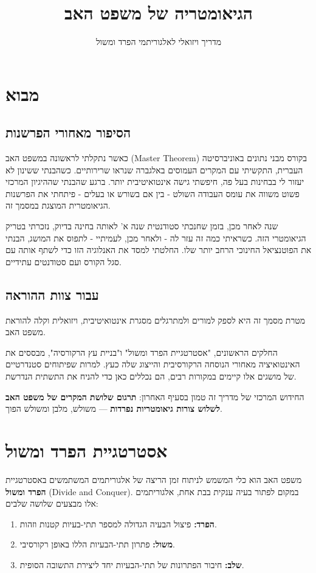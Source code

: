 \documentclass[11pt, a4paper]{article}
\title{\Huge \textbf{הגיאומטריה של משפט האב}}
\author{מדריך ויזואלי לאלגוריתמי הפרד ומשול}
\date{}
\begin{document}
\maketitle

\section*{מבוא}

\subsection*{הסיפור מאחורי הפרשנות}
כאשר נתקלתי לראשונה במשפט האב (\textenglish{Master Theorem}) בקורס מבני נתונים באוניברסיטה העברית, התקשיתי עם המקרים העמוסים באלגברה שנראו שרירותיים. כשהבנתי ששינון לא יעזור לי בבחינות בעל פה, חיפשתי גישה אינטואיטיבית יותר. ברגע שהבנתי שההיגיון המרכזי פשוט משווה את עומס העבודה השולט - בין אם בשורש או בעלים - פיתחתי את הפרשנות הגיאומטרית המוצגת במסמך זה.

שנה לאחר מכן, בזמן שחנכתי סטודנטית שנה א' לאותה בחינה בדיוק, נזכרתי בטריק הגיאומטרי הזה. כשראיתי כמה זה עזר לה - ולאחר מכן, לעמיתיי - לתפוס את המושג, הבנתי את הפוטנציאל החינוכי הרחב יותר שלו. החלטתי למסד את האנלוגיה הזו כדי לשתף אותה עם סגל הקורס ועם סטודנטים עתידיים.

\subsection*{עבור צוות ההוראה}
מטרת מסמך זה היא לספק למורים ולמתרגלים מסגרת אינטואיטיבית, ויזואלית וקלה להוראת משפט האב.

החלקים הראשונים, "אסטרטגיית הפרד ומשול" ו"בניית עץ הרקורסיה", מבססים את האינטואיציה מאחורי הנוסחה הרקורסיבית והייצוג שלה כעץ. למרות שפיתוחים סטנדרטיים של מושגים אלו קיימים במקורות רבים, הם נכללים כאן כדי להניח את התשתית הנדרשת.

החידוש המרכזי של מדריך זה טמון בסעיף האחרון: \textbf{תרגום שלושת המקרים של משפט האב לשלוש צורות גיאומטריות נפרדות} — משולש, מלבן ומשולש הפוך.

\newpage
\section*{אסטרטגיית הפרד ומשול}

משפט האב הוא כלי המשמש לניתוח זמן הריצה של אלגוריתמים המשתמשים באסטרטגיית \textbf{הפרד ומשול} (\textenglish{Divide and Conquer}). במקום לפתור בעיה ענקית בבת אחת, אלגוריתמים אלו מבצעים שלושה שלבים:
\begin{enumerate}
    \item \textbf{הפרד:} פיצול הבעיה הגדולה למספר תתי-בעיות קטנות וזהות.
    \item \textbf{משול:} פתרון תתי-הבעיות הללו באופן רקורסיבי.
    \item \textbf{שלב:} חיבור הפתרונות של תתי-הבעיות יחד ליצירת התשובה הסופית.
\end{enumerate}
\end{document}
